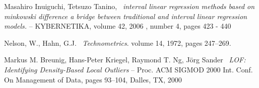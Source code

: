 \documentclass[a4paper,14pt]{extarticle}
\begin{document}
\begin{thebibliography}{8}
    Masahiro Inuiguchi, Tetsuzo Tanino,~
    \textit{interval linear regression methods based on minkowski difference a bridge between traditional and interval linear regression models.} --
    KYBERNETIKA, volume 42, 2006 , number 4, pages 423 - 440

     Nelson, W., Hahn, G.J.~
    \textit{Technometrics}. 
    volume 14, 1972, pages 247–269.

    Markus M. Breunig, Hans-Peter Kriegel, Raymond T. Ng, Jörg Sander~
    \textit{LOF: Identifying Density-Based Local Outliers}
   -- Proc. ACM SIGMOD 2000 Int. Conf. On Management of Data, pages 93--104, Dalles, TX, 2000
\end{thebibliography}
\newpage


\end{document}
